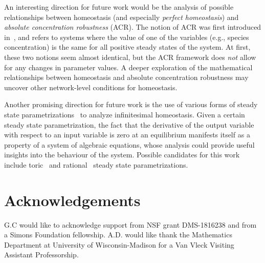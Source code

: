 \documentclass[11pt]{article}
\theoremstyle{plain}
\theoremstyle{definition}
\theoremstyle{remark}
\begin{document}

An interesting direction for future work would be the analysis of possible relationships between  homeostasis (and especially {\em perfect homeostasis}) and \emph{absolute concentration robustness} (ACR). The notion of ACR was first introduced in~\cite{shinar2010structural}, and refers to systems where the value of one of the variables (e.g., species concentration) is the same for all positive steady states of the system. At first, these two notions seem almost identical, but the ACR framework does {\em not} allow for any changes in parameter values. 
A deeper exploration of the mathematical relationships between homeostasis and absolute concentration robustness may uncover other network-level conditions for homeostasis.

Another promising direction for future work is the use of various forms of steady state parametrizations~\cite{perez2018structure,feliu2013variable} to analyze infinitesimal homeostasis. Given a certain steady state parametrization, the fact that the derivative of the output variable with respect to an input variable is zero at an equilibrium manifests itself as a property of a system of algebraic equations, whose analysis could provide useful insights into the behaviour of the system. Possible candidates for this work include toric~\cite{millan2012chemical} and rational~\cite{thomson2009rational} steady state parametrizations.



\section{Acknowledgements}
G.C would like to acknowledge support from NSF grant DMS-1816238 and from a Simons Foundation fellowship. A.D. would like thank the Mathematics Department at University of Wisconsin-Madison for a Van Vleck Visiting Assistant Professorship.




\end{document}
